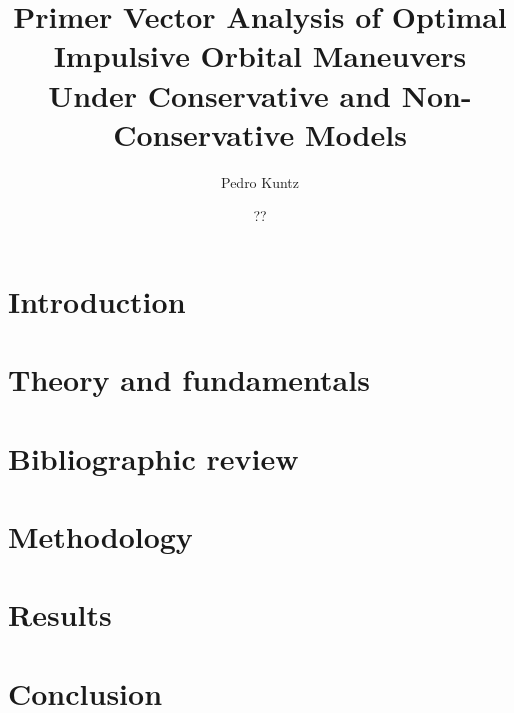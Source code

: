 \documentclass[tg, eng]{ita}    %
\author{Pedro Kuntz}{Puglia}
\title{Primer Vector Analysis of Optimal Impulsive Orbital Maneuvers Under Conservative and Non-Conservative Models}
\date{??}{junho}{2025}
\begin{document}


\mainmatter


\chapter{\textbf{Introduction}}


\chapter{\textbf{Theory and fundamentals}}


\chapter{\textbf{Bibliographic review}}



\chapter{\textbf{Methodology}}\label{chap:method}


\chapter{\textbf{Results}}


% 
\chapter{Conclusion}

\renewcommand\bibname{\itareferencesnamebabel} %


\appendix


\annex

\end{document}
